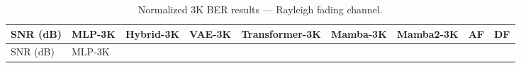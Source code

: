 \documentclass[
  english,
  12pt,
  12pt,
  a4paper,
  oneside]{report}
\begin{document}
\begin{longtable}[]{@{}
  >{\raggedright\arraybackslash}p{}
  >{\raggedright\arraybackslash}p{}
  >{\raggedright\arraybackslash}p{}
  >{\raggedright\arraybackslash}p{}
  >{\raggedright\arraybackslash}p{}
  >{\raggedright\arraybackslash}p{}
  >{\raggedright\arraybackslash}p{}
  >{\raggedright\arraybackslash}p{}
  >{\raggedright\arraybackslash}p{}@{}}
\caption{Normalized 3K BER results --- Rayleigh fading channel.}\label{tbl:table8}\tabularnewline
\toprule\noalign{}
\begin{minipage}[b]{\linewidth}\raggedright
SNR (dB)
\end{minipage} & \begin{minipage}[b]{\linewidth}\raggedright
MLP-3K
\end{minipage} & \begin{minipage}[b]{\linewidth}\raggedright
Hybrid-3K
\end{minipage} & \begin{minipage}[b]{\linewidth}\raggedright
VAE-3K
\end{minipage} & \begin{minipage}[b]{\linewidth}\raggedright
Transformer-3K
\end{minipage} & \begin{minipage}[b]{\linewidth}\raggedright
Mamba-3K
\end{minipage} & \begin{minipage}[b]{\linewidth}\raggedright
Mamba2-3K
\end{minipage} & \begin{minipage}[b]{\linewidth}\raggedright
AF
\end{minipage} & \begin{minipage}[b]{\linewidth}\raggedright
DF
\end{minipage} \\
\midrule\noalign{}
\endfirsthead
\toprule\noalign{}
\begin{minipage}[b]{\linewidth}\raggedright
SNR (dB)
\end{minipage} & \begin{minipage}[b]{\linewidth}\raggedright
MLP-3K
\end{minipage} & \begin{minipage}[b]{\linewidth}\raggedright

\end{minipage}
\end{longtable}
\end{document}
